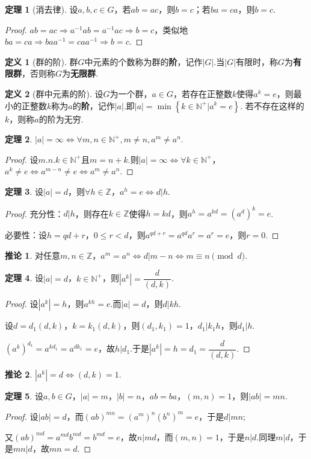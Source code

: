 \documentclass[12pt]{ctexart}
\theoremstyle{definition}
\newtheorem{definition}{定义}
\newtheorem{theorem}{定理}
\newtheorem{corollary}{推论}
\theoremstyle{plain}
\begin{document}
	\begin{theorem}[消去律]
		设$a,b,c\in G$，若$ab=ac$，则$b=c$；若$ba=ca$，则$b=c$.
	\end{theorem}
	\begin{proof}
		$ab=ac\Rightarrow a^{-1}ab=a^{-1}ac\Rightarrow b=c$，类似地$ba=ca\Rightarrow baa^{-1}=caa^{-1}\Rightarrow b=c$.
	\end{proof}
	\begin{definition}[群的阶]
		群$G$中元素的个数称为群的\textbf{阶}，记作$|G|$.当$|G|$有限时，称$G$为\textbf{有限群}，否则称$G$为\textbf{无限群}.
	\end{definition}
	\begin{definition}[群中元素的阶]
		设$G$为一个群，$a\in G$，若存在正整数$k$使得$a^k=e$，则最小的正整数$k$称为$a$的\textbf{阶}，记作$|a|$.即$|a|=\min\left\{k\in \mathbb{N}^+|a^k=e\right\}$. 若不存在这样的$k$，则称$a$的阶为无穷.
	\end{definition}
	\begin{theorem}
		$|a|=\infty\iff \forall m, n\in \mathbb{N}^+,m\neq n,a^m\neq a^n$.
	\end{theorem}
	\begin{proof}
		设$m.n.k\in\mathbb{N}^+$且$m=n+k$.则$|a|=\infty\iff \forall k\in\mathbb{N}^+$，$a^k\neq e\iff a^{m-n}\neq e\iff a^m\neq a^n$.
	\end{proof}
	\begin{theorem}
		设$|a|=d$，则$\forall h\in\mathbb{Z}$，$a^h=e\iff d|h$.
	\end{theorem}
	\begin{proof}
		充分性：$d|h$，则存在$k\in\mathbb{Z}$使得$h=kd$，则$a^{h}=a^{kd}=(a^{d})^k=e$.
		
		必要性：设$h=qd+r$，$0 \leqslant r<d$，则$a^{qd+r}=a^{qd}a^{r}=a^r=e$，则$r=0$.
	\end{proof}
	\begin{corollary}
		对任意$m,n\in\mathbb{Z}$，$a^m=a^n\iff d|m-n\iff m\equiv n\pmod d$.
	\end{corollary}
	\begin{theorem}
		设$|a|=d$，$k\in\mathbb{N}^+$，则$|a^k|=\dfrac{d}{(d,k)}$.
	\end{theorem}
	\begin{proof}
		设$|a^k|=h$，则$a^{kh}=e$.而$|a|=d$，则$d|kh$.
		
		设$d=d_1(d,k)$，$k=k_1(d,k)$，则$(d_1,k_1)=1$，$d_1|k_1h$，则$d_1|h$.
		
		$(a^k)^{d_1}=a^{kd_1}=a^{dk_1}=e$，故$h|d_1$.于是$|a^k|=h=d_1=\dfrac{d}{(d,k)}$.
	\end{proof}
	\begin{corollary}
		$|a^k|=d\iff (d,k)=1$.
	\end{corollary}
	\begin{theorem}
		设$a,b\in G$，$|a|=m$，$|b|=n$，$ab=ba$，$(m,n)=1$，则$|ab|=mn$.
	\end{theorem}
	\begin{proof}
		设$|ab|=d$，而$(ab)^{mn}=(a^m)^n(b^n)^m=e$，于是$d|mn$;
		
		又$(ab)^{md}=a^{md}b^{md}=b^{md}=e$，故$n|md$，而$(m,n)=1$，于是$n|d$.同理$m|d$，于是$mn|d$，故$mn=d$.
	\end{proof}
\end{document}
